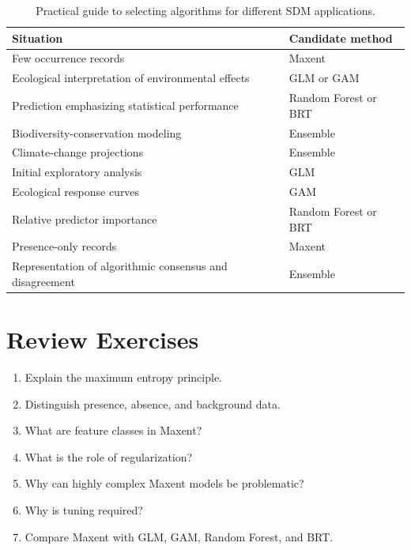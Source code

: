 \begin{table}[H]
\centering
\caption{Practical guide to selecting algorithms for different SDM applications.}
\label{tab:guia_escolha_algoritmos}
\small
\begin{tabular}{p{}p{}}
\toprule
\textbf{Situation} & \textbf{Candidate method} \\
\midrule
Few occurrence records & Maxent \\
Ecological interpretation of environmental effects & GLM or GAM \\
Prediction emphasizing statistical performance & Random Forest or BRT \\
Biodiversity-conservation modeling & Ensemble \\
Climate-change projections & Ensemble \\
Initial exploratory analysis & GLM \\
Ecological response curves & GAM \\
Relative predictor importance & Random Forest or BRT \\
Presence-only records & Maxent \\
Representation of algorithmic consensus and disagreement & Ensemble \\
\bottomrule
\end{tabular}
\end{table}

\begin{center}
\end{center}

\section{Review Exercises}
\begin{enumerate}
  \item Explain the maximum entropy principle.
  \item Distinguish presence, absence, and background data.
  \item What are feature classes in Maxent?
  \item What is the role of regularization?
  \item Why can highly complex Maxent models be problematic?
  \item Why is tuning required?
  \item Compare Maxent with GLM, GAM, Random Forest, and BRT.
\end{enumerate}

